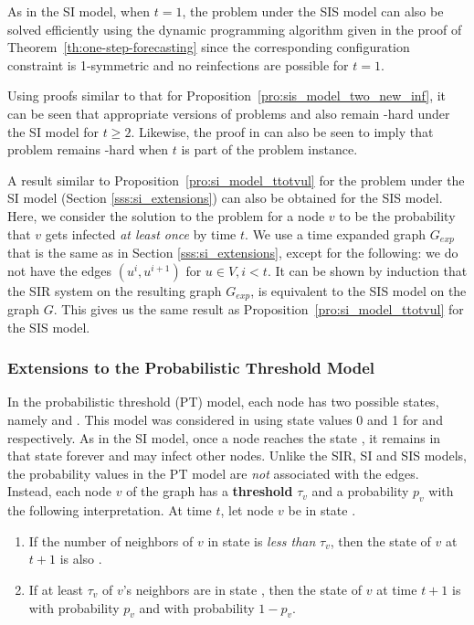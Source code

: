 As in the SI model, when $t = 1$, the \tNewInfs{} problem
under the SIS model can also be solved efficiently using the dynamic
programming algorithm given in the proof of 
Theorem~\ref{th:one-step-forecasting} since the corresponding
configuration constraint is 1-symmetric and no reinfections
are possible for $t = 1$.

Using proofs similar to that for Proposition~\ref{pro:sis_model_two_new_inf},
it can be seen that appropriate versions of problems \tTotInfs{} and \tPeak{} 
also remain \cnump-hard under the SI model for $t \geq 2$.
Likewise, the proof in \cite{SD-2012} can also be seen to imply
that \tVuls{} problem remains \cnump-hard when $t$ is part of the problem instance.

A result similar to Proposition~\ref{pro:si_model_ttotvul} for the
\tTotVuls{} problem under the SI model (Section \ref{sss:si_extensions}) 
can also be obtained for the SIS model.
Here, we consider the solution to the \tTotVuls{} problem for
a node $v$ to be the probability that $v$ gets infected 
\emph{at least once} by time $t$.
We use a time expanded graph $G_{exp}$ that is the same as in
Section \ref{sss:si_extensions}, except for the following:
we do not have the edges $(u^i, u^{i+1})$ for $u\in V, i <  t$. 
It can be shown by induction that 
the SIR system on the resulting graph $G_{exp}$, 
is equivalent to the SIS model on the graph $G$.
This gives us the same result as 
Proposition~\ref{pro:si_model_ttotvul} for the SIS model.


\subsubsection{Extensions to the Probabilistic Threshold Model}
\label{sss:pthresh_extensions}

In the probabilistic threshold (PT) model, each node has two possible states,
namely \sstate{} and \istate.
This model was considered in \cite{BH+2011} using state values 0 and
1 for \sstate{} and \istate{} respectively.
As in the SI model, once a node reaches the state \istate, it remains in that
state forever and may infect other nodes.
Unlike the SIR, SI and SIS models, the probability values in the PT
model are \emph{not} associated with the edges.
Instead, each node $v$ of the graph has a \textbf{threshold} $\tau_v$ 
and a probability $p_v$ with the following interpretation.
At time $t$, let node $v$ be in state \sstate.
\begin{enumerate}
\item If the number of neighbors of $v$ in state \istate{} is \emph{less than}
$\tau_v$, then the state of $v$ at $t+1$ is also \sstate.

\item If at least $\tau_v$ of $v$'s neighbors are in state \istate,
then the state of $v$ at time $t+1$ is \istate{} with probability $p_v$ and
\sstate{} with probability $1 - p_v$.
\end{enumerate}

